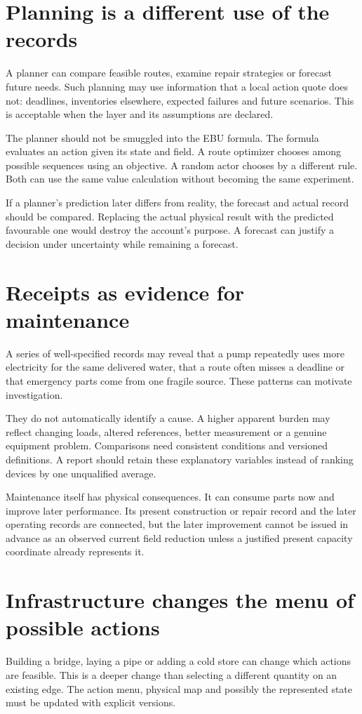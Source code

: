 \section{Planning is a different use of the records}
A planner can compare feasible routes, examine repair strategies or forecast future needs. Such planning may use information that a local action quote does not: deadlines, inventories elsewhere, expected failures and future scenarios. This is acceptable when the layer and its assumptions are declared.

The planner should not be smuggled into the EBU formula. The formula evaluates an action given its state and field. A route optimizer chooses among possible sequences using an objective. A random actor chooses by a different rule. Both can use the same value calculation without becoming the same experiment.

If a planner's prediction later differs from reality, the forecast and actual record should be compared. Replacing the actual physical result with the predicted favourable one would destroy the account's purpose. A forecast can justify a decision under uncertainty while remaining a forecast.

\section{Receipts as evidence for maintenance}
A series of well-specified records may reveal that a pump repeatedly uses more electricity for the same delivered water, that a route often misses a deadline or that emergency parts come from one fragile source. These patterns can motivate investigation.

They do not automatically identify a cause. A higher apparent burden may reflect changing loads, altered references, better measurement or a genuine equipment problem. Comparisons need consistent conditions and versioned definitions. A report should retain these explanatory variables instead of ranking devices by one unqualified average.

Maintenance itself has physical consequences. It can consume parts now and improve later performance. Its present construction or repair record and the later operating records are connected, but the later improvement cannot be issued in advance as an observed current field reduction unless a justified present capacity coordinate already represents it.

\section{Infrastructure changes the menu of possible actions}
Building a bridge, laying a pipe or adding a cold store can change which actions are feasible. This is a deeper change than selecting a different quantity on an existing edge. The action menu, physical map and possibly the represented state must be updated with explicit versions.

